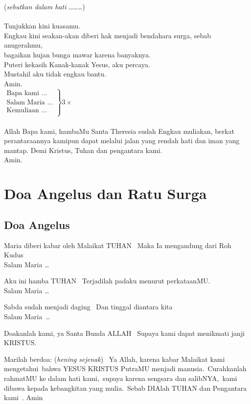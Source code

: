 (\textit{sebutkan dalam hati} \ldots\ldots\ldots) \\
\\Tunjukkan kini kuasamu.\\ Engkau kini seakan-akan diberi hak menjadi bendahara surga, 
sebab anugerahmu, \\ bagaikan hujan bunga mawar karena banyaknya.\\
Puteri kekasih Kanak-kanak Yesus, aku percaya. \\Mustahil aku tidak engkau bantu. \\
Amin.\\

$ \left.
\begin{array}{c}
\textrm{Bapa kami \ldots} \\
\textrm{Salam Maria \ldots}\\
\textrm{Kemuliaan \ldots} \\
\end{array}
\right\rbrace 3 \times
$
\\

\\
Allah Bapa kami, hambaMu Santa Theresia sudah Engkau muliakan, berkat perantaraannya kamipun dapat melalui jalan yang rendah hati dan iman yang mantap. Demi Kristus, Tuhan dan pengantara kami. \\Amin.

\section{Doa Angelus dan Ratu Surga}
\subsection*{Doa Angelus}
Maria diberi kabar oleh Malaikat TUHAN~ Maka Ia mengandung dari Roh
Kudus~ \\
Salam Maria {\ldots}~  

Aku ini hamba TUHAN~ Terjadilah padaku menurut
perkataanMU.~ \\
Salam Maria {\ldots}~  

Sabda sudah menjadi daging~ Dan tinggal
diantara kita~ \\
Salam Maria~{\ldots}  

Doakanlah kami, ya Santa Bunda
ALLAH~ Supaya kami dapat menikmati janji KRISTUS.~

Marilah berdoa: (\textit{hening sejenak})~ Ya Allah, karena kabar Malaikat kami
mengetahui~bahwa YESUS KRISTUS PutraMU menjadi manusia.~Curahkanlah
rahmatMU ke dalam hati kami,~supaya karena sengsara dan salibNYA,~kami
dibawa kepada kebangkitan yang mulia.~Sebab DIAlah TUHAN dan Pengantara
kami~.  Amin~

